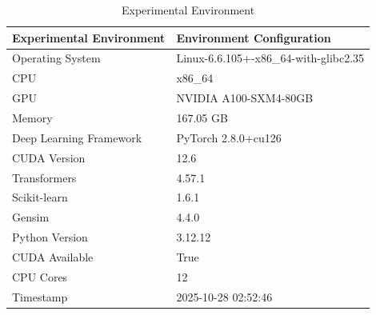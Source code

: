 \begin{table}
\caption{Experimental Environment}
\label{tab:env}
\begin{tabular}{ll}
\toprule
Experimental Environment & Environment Configuration \\
\midrule
Operating System & Linux-6.6.105+-x86_64-with-glibc2.35 \\
CPU & x86_64 \\
GPU & NVIDIA A100-SXM4-80GB \\
Memory & 167.05 GB \\
Deep Learning Framework & PyTorch 2.8.0+cu126 \\
CUDA Version & 12.6 \\
Transformers & 4.57.1 \\
Scikit-learn & 1.6.1 \\
Gensim & 4.4.0 \\
Python Version & 3.12.12 \\
CUDA Available & True \\
CPU Cores & 12 \\
Timestamp & 2025-10-28 02:52:46 \\
\bottomrule
\end{tabular}
\end{table}
